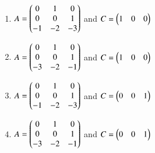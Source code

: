\begin{enumerate}[label=\arabic*.,ref=\theenumi]
\begin{enumerate}[label = (\Alph*)]
    \item $A = \begin{pmatrix}
     0 &  1 &  0\\ 
     0 &  0 &  1\\
    -1 & -2 & -3
    \end{pmatrix}$ and $C = \begin{pmatrix}1 & 0 & 0\end{pmatrix}$
    \item $A = \begin{pmatrix}
     0 &  1 &  0\\ 
     0 &  0 &  1\\
    -3 & -2 & -1
    \end{pmatrix}$ and $C = \begin{pmatrix}1 & 0 & 0\end{pmatrix}$
    \item $A = \begin{pmatrix}
     0 &  1 &  0\\ 
     0 &  0 &  1\\
    -1 & -2 & -3
    \end{pmatrix}$ and $C = \begin{pmatrix}0 & 0 & 1\end{pmatrix}$
    \item $A = \begin{pmatrix}
     0 &  1 &  0\\ 
     0 &  0 &  1\\
    -3 & -2 & -1
    \end{pmatrix}$ and $C = \begin{pmatrix}0 & 0 & 1\end{pmatrix}$
    \end{enumerate}
%
\solution



\end{enumerate}